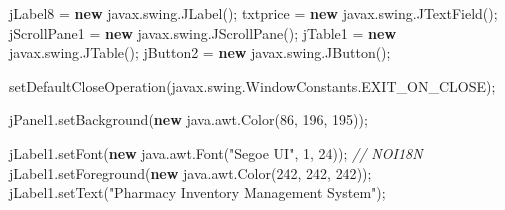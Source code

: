 \documentclass[
  10pt,
]{article}
\newenvironment{Shaded}{}{}
\newcommand{\CommentTok}[1]{\textcolor[rgb]{0.38,0.63,0.69}{\textit{#1}}}
\newcommand{\DecValTok}[1]{\textcolor[rgb]{0.25,0.63,0.44}{#1}}
\newcommand{\FunctionTok}[1]{\textcolor[rgb]{0.02,0.16,0.49}{#1}}
\newcommand{\KeywordTok}[1]{\textcolor[rgb]{0.00,0.44,0.13}{\textbf{#1}}}
\newcommand{\NormalTok}[1]{#1}
\newcommand{\OperatorTok}[1]{\textcolor[rgb]{0.40,0.40,0.40}{#1}}
\newcommand{\StringTok}[1]{\textcolor[rgb]{0.25,0.44,0.63}{#1}}
\begin{document}
\begin{Shaded}
\begin{Highlighting}[numbers=left,,]
\NormalTok{        jLabel8 }\OperatorTok{=} \KeywordTok{new}\NormalTok{ javax}\OperatorTok{.}\FunctionTok{swing}\OperatorTok{.}\FunctionTok{JLabel}\OperatorTok{();}
\NormalTok{        txtprice }\OperatorTok{=} \KeywordTok{new}\NormalTok{ javax}\OperatorTok{.}\FunctionTok{swing}\OperatorTok{.}\FunctionTok{JTextField}\OperatorTok{();}
\NormalTok{        jScrollPane1 }\OperatorTok{=} \KeywordTok{new}\NormalTok{ javax}\OperatorTok{.}\FunctionTok{swing}\OperatorTok{.}\FunctionTok{JScrollPane}\OperatorTok{();}
\NormalTok{        jTable1 }\OperatorTok{=} \KeywordTok{new}\NormalTok{ javax}\OperatorTok{.}\FunctionTok{swing}\OperatorTok{.}\FunctionTok{JTable}\OperatorTok{();}
\NormalTok{        jButton2 }\OperatorTok{=} \KeywordTok{new}\NormalTok{ javax}\OperatorTok{.}\FunctionTok{swing}\OperatorTok{.}\FunctionTok{JButton}\OperatorTok{();}

        \FunctionTok{setDefaultCloseOperation}\OperatorTok{(}\NormalTok{javax}\OperatorTok{.}\FunctionTok{swing}\OperatorTok{.}\FunctionTok{WindowConstants}\OperatorTok{.}\FunctionTok{EXIT\_ON\_CLOSE}\OperatorTok{);}

\NormalTok{        jPanel1}\OperatorTok{.}\FunctionTok{setBackground}\OperatorTok{(}\KeywordTok{new}\NormalTok{ java}\OperatorTok{.}\FunctionTok{awt}\OperatorTok{.}\FunctionTok{Color}\OperatorTok{(}\DecValTok{86}\OperatorTok{,} \DecValTok{196}\OperatorTok{,} \DecValTok{195}\OperatorTok{));}

\NormalTok{        jLabel1}\OperatorTok{.}\FunctionTok{setFont}\OperatorTok{(}\KeywordTok{new}\NormalTok{ java}\OperatorTok{.}\FunctionTok{awt}\OperatorTok{.}\FunctionTok{Font}\OperatorTok{(}\StringTok{"Segoe UI"}\OperatorTok{,} \DecValTok{1}\OperatorTok{,} \DecValTok{24}\OperatorTok{));} \CommentTok{// NOI18N}
\NormalTok{        jLabel1}\OperatorTok{.}\FunctionTok{setForeground}\OperatorTok{(}\KeywordTok{new}\NormalTok{ java}\OperatorTok{.}\FunctionTok{awt}\OperatorTok{.}\FunctionTok{Color}\OperatorTok{(}\DecValTok{242}\OperatorTok{,} \DecValTok{242}\OperatorTok{,} \DecValTok{242}\OperatorTok{));}
\NormalTok{        jLabel1}\OperatorTok{.}\FunctionTok{setText}\OperatorTok{(}\StringTok{"Pharmacy Inventory Management System"}\OperatorTok{);}


\end{Highlighting}
\end{Shaded}
\end{document}
